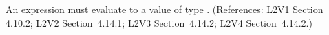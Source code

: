 An \Event {} expression must evaluate to a value of type
.  (References: L2V1 Section 4.10.2; L2V2 Section~4.14.1;
L2V3 Section~4.14.2; L2V4 Section~4.14.2.)
